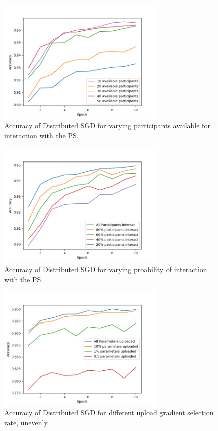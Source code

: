 \documentclass[conference]{IEEEtran}
\begin{document}
\begin{figure}[!h]
\includegraphics[width=8cm, keepaspectratio]{VaryingPoolofParticipants}
\caption{Accuracy of Distributed SGD for varying participants available for interaction with the PS.}
\label{fig:VaryingPoolofParticipants}
\end{figure}

\begin{figure}[!h]
\includegraphics[width=8cm, keepaspectratio]{VaryingProbabilityInteraction}
\caption{Accuracy of Distributed SGD for varying proability of interaction with the PS. }
\label{fig:VaryingProbabilityInteraction}
\end{figure}


\begin{figure}[!h]
\includegraphics[width=8cm, keepaspectratio]{VaryingThetaU}
\caption{Accuracy of Distributed SGD for different upload gradient selection rate, unevenly. }
\label{fig:VaryingThetaU}
\end{figure}
\end{document}
